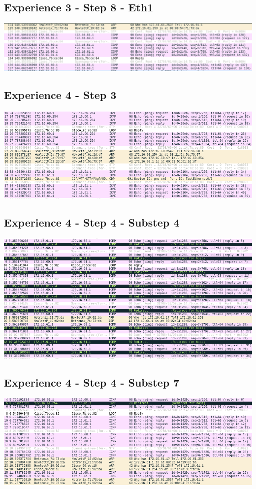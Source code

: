 \documentclass[11pt]{report}
\begin{document}
\subsection{Experience 3 - Step 8 - Eth1}
  \includegraphics[width=1\textwidth]{images/exp3_step8_eth1.png}
\subsection{Experience 4 - Step 3}
  \includegraphics[width=1\textwidth]{images/exp4_step3.png}
\subsection{Experience 4 - Step 4 - Substep 4}
  \includegraphics[width=1\textwidth]{images/exp4_step4_substep4.png}
\subsection{Experience 4 - Step 4 - Substep 7}
  \includegraphics[width=1\textwidth]{images/exp4_step4_substep7.png}
\end{document}
